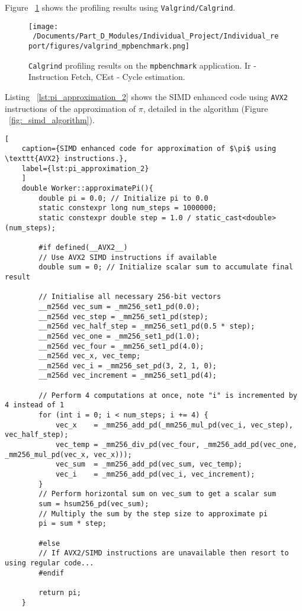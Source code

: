  Figure ~\ref{fig:mpbenchmark_profiled} shows the profiling results using \texttt{Valgrind/Calgrind}. 

\begin{figure}[H] %
	\centering
	\texttt{[image: ~/Documents/Part\_D\_Modules/Individual\_Project/Individual\_report/figures/valgrind\_mpbenchmark.png]} %
	\caption{\texttt{Calgrind} profiling results on the \texttt{mpbenchmark} application. Ir - Instruction Fetch, CEst - Cycle estimation.}
	\label{fig:mpbenchmark_profiled} %
\end{figure} 

Listing ~\ref{lst:pi_approximation_2} shows the SIMD enhanced code using \texttt{AVX2} instructions of the approximation of $\pi$, detailed in the algorithm (Figure ~\ref{fig:_simd_algorithm}).

\begin{lstlisting}[
	caption={SIMD enhanced code for approximation of $\pi$ using \texttt{AVX2} instructions.},
	label={lst:pi_approximation_2}
	]
	double Worker::approximatePi(){
		double pi = 0.0; // Initialize pi to 0.0
		static constexpr long num_steps = 1000000; 
		static constexpr double step = 1.0 / static_cast<double>(num_steps); 
		
		#if defined(__AVX2__)
		// Use AVX2 SIMD instructions if available
		double sum = 0; // Initialize scalar sum to accumulate final result
		
		// Initialise all necessary 256-bit vectors
		__m256d vec_sum = _mm256_set1_pd(0.0);
		__m256d vec_step = _mm256_set1_pd(step);
		__m256d vec_half_step = _mm256_set1_pd(0.5 * step); 
		__m256d vec_one = _mm256_set1_pd(1.0); 
		__m256d vec_four = _mm256_set1_pd(4.0); 
		__m256d vec_x, vec_temp; 
		__m256d vec_i = _mm256_set_pd(3, 2, 1, 0); 
		__m256d vec_increment = _mm256_set1_pd(4); 
		
		// Perform 4 computations at once, note "i" is incremented by 4 instead of 1
		for (int i = 0; i < num_steps; i += 4) {
			vec_x    = _mm256_add_pd(_mm256_mul_pd(vec_i, vec_step), vec_half_step); 
			vec_temp = _mm256_div_pd(vec_four, _mm256_add_pd(vec_one, _mm256_mul_pd(vec_x, vec_x))); 
			vec_sum  = _mm256_add_pd(vec_sum, vec_temp); 
			vec_i    = _mm256_add_pd(vec_i, vec_increment); 
		}
		// Perform horizontal sum on vec_sum to get a scalar sum
		sum = hsum256_pd(vec_sum);
		// Multiply the sum by the step size to approximate pi
		pi = sum * step; 
		
		#else
		// If AVX2/SIMD instructions are unavailable then resort to using regular code... 
		#endif
		
		return pi; 
	}
\end{lstlisting}

